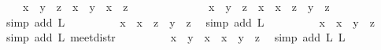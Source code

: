 \begin{isabellebody}
\ \ \ \ {\isachardoublequoteopen}x\ {\isasymsqunion}\ {\isacharparenleft}y\ {\isasymsqinter}\ z{\isacharparenright}\ {\isacharequal}\ {\isacharparenleft}x\ {\isasymsqunion}\ y{\isacharparenright}\ {\isasymsqinter}\ {\isacharparenleft}x\ {\isasymsqunion}\ z{\isacharparenright}{\isachardoublequoteclose}\ \ \isanewline
%
\isadelimproof
\ \ \ \ %
\endisadelimproof
%
\isatagproof
{}\isamarkupfalse%
\ {\isacharminus}\isanewline
\ \ \ \ \isamarkupfalse%
\ {\isachardoublequoteopen}x\ {\isasymsqunion}\ {\isacharparenleft}y\ {\isasymsqinter}\ z{\isacharparenright}\ {\isacharequal}\ {\isacharparenleft}x\ {\isasymsqunion}\ {\isacharparenleft}x\ {\isasymsqinter}\ z{\isacharparenright}{\isacharparenright}\ {\isasymsqunion}\ {\isacharparenleft}y\ {\isasymsqinter}\ z{\isacharparenright}{\isachardoublequoteclose}\ \isamarkupfalse%
\ {\isacharparenleft}simp\ add{\isacharcolon}\ L{}{\isacharparenright}\isanewline
\ \ \ \ \isamarkupfalse%
\ \isamarkupfalse%
\ {\isachardoublequoteopen}{\isachardot}{\isachardot}{\isachardot}\ {\isacharequal}\ x\ {\isasymsqunion}\ {\isacharparenleft}{\isacharparenleft}x\ {\isasymsqinter}\ z{\isacharparenright}\ {\isasymsqunion}\ {\isacharparenleft}y\ {\isasymsqinter}\ z{\isacharparenright}{\isacharparenright}{\isachardoublequoteclose}\ \isamarkupfalse%
\ {\isacharparenleft}simp\ add{\isacharcolon}\ L{}{\isacharparenright}\isanewline
\ \ \ \ \isamarkupfalse%
\ \isamarkupfalse%
\ {\isachardoublequoteopen}{\isachardot}{\isachardot}{\isachardot}\ {\isacharequal}\ x\ {\isasymsqunion}\ {\isacharparenleft}{\isacharparenleft}x\ {\isasymsqunion}\ y{\isacharparenright}\ {\isasymsqinter}\ z{\isacharparenright}{\isachardoublequoteclose}\ \isamarkupfalse%
\ {\isacharparenleft}simp\ add{\isacharcolon}\ L{}\ meet{\isacharunderscore}distr{\isacharparenright}\isanewline
\ \ \ \ \isamarkupfalse%
\ \isamarkupfalse%
\ {\isachardoublequoteopen}{\isachardot}{\isachardot}{\isachardot}\ {\isacharequal}\ {\isacharparenleft}{\isacharparenleft}x\ {\isasymsqunion}\ y{\isacharparenright}\ {\isasymsqinter}\ x{\isacharparenright}\ {\isasymsqunion}\ {\isacharparenleft}{\isacharparenleft}x\ {\isasymsqunion}\ y{\isacharparenright}\ {\isasymsqinter}\ z{\isacharparenright}{\isachardoublequoteclose}\ \isamarkupfalse%
\ {\isacharparenleft}simp\ add{\isacharcolon}\ L{}\ L{}{\isacharparenright}\isanewline
\ \ \ \ \isamarkupfalse%

\end{isabellebody}
